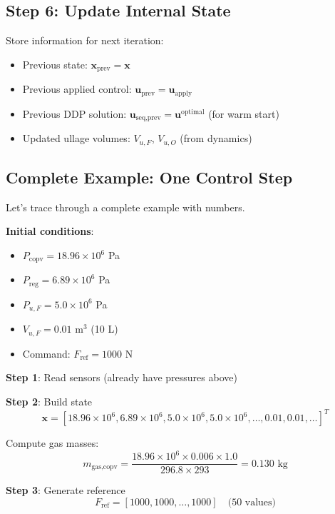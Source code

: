 \documentclass[11pt,a4paper]{article}
\begin{document}
\subsection{Step 6: Update Internal State}

Store information for next iteration:
\begin{itemize}
    \item Previous state: $\mathbf{x}_{\text{prev}} = \mathbf{x}$
    \item Previous applied control: $\mathbf{u}_{\text{prev}} = \mathbf{u}_{\text{apply}}$
    \item Previous DDP solution: $\mathbf{u}_{\text{seq,prev}} = \mathbf{u}^{\text{optimal}}$ (for warm start)
    \item Updated ullage volumes: $V_{u,F}$, $V_{u,O}$ (from dynamics)
\end{itemize}

\subsection{Complete Example: One Control Step}

Let's trace through a complete example with numbers.

\textbf{Initial conditions}:
\begin{itemize}
    \item $P_{\text{copv}} = 18.96 \times 10^6$ Pa
    \item $P_{\text{reg}} = 6.89 \times 10^6$ Pa
    \item $P_{u,F} = 5.0 \times 10^6$ Pa
    \item $V_{u,F} = 0.01$ m$^3$ (10 L)
    \item Command: $F_{\text{ref}} = 1000$ N
\end{itemize}

\textbf{Step 1}: Read sensors (already have pressures above)

\textbf{Step 2}: Build state
\begin{equation}
\mathbf{x} = [18.96 \times 10^6, 6.89 \times 10^6, 5.0 \times 10^6, 5.0 \times 10^6, \ldots, 0.01, 0.01, \ldots]^T
\end{equation}

Compute gas masses:
\begin{equation}
m_{\text{gas,copv}} = \frac{18.96 \times 10^6 \times 0.006 \times 1.0}{296.8 \times 293} = 0.130 \text{ kg}
\end{equation}

\textbf{Step 3}: Generate reference
\begin{equation}
F_{\text{ref}} = [1000, 1000, \ldots, 1000] \quad \text{(50 values)}
\end{equation}
\end{document}
